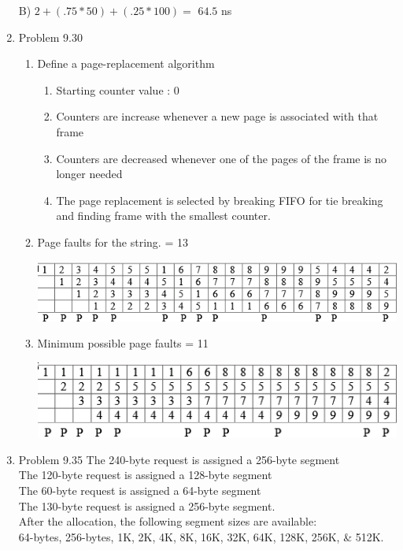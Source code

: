 \documentclass[a4paper,11pt]{article}
\theoremstyle{mytheor}
\begin{document}
\begin{enumerate}
    B) $2 + (.75 * 50) + (.25 * 100) =$ $64.5$ ns\\ 
\pagebreak
\item{Problem 9.30}
    \begin{enumerate}
    \item Define a page-replacement algorithm \par
        \begin{enumerate}
        \item Starting counter value : 0
        \item Counters are increase whenever a new page is associated with that frame
        \item Counters are decreased whenever one of the pages of 
                the frame is no longer needed
        \item The page replacement is selected by breaking FIFO 
                for tie breaking and finding frame with the smallest counter.
        \end{enumerate}
    \item Page faults for the string.  = 13 \par
        \includegraphics[width=1\textwidth]{930_PB.png}
    \item Minimum possible page faults = 11\par
        \includegraphics[width=1\textwidth]{930_PC.png}
    \end{enumerate}
\item{Problem 9.35}
    The 240-byte request is assigned a 256-byte segment\\ 
    The 120-byte request is assigned a 128-byte segment\\
    The 60-byte request is assigned a 64-byte segment \\
    The 130-byte request is assigned a 256-byte segment.\\
    After the allocation, the following segment sizes are available:\\
    64-bytes, 256-bytes, 1K, 2K, 4K, 8K, 16K, 32K, 64K, 128K, 256K, \& 512K.\\
    

\end{enumerate}
\end{document}
